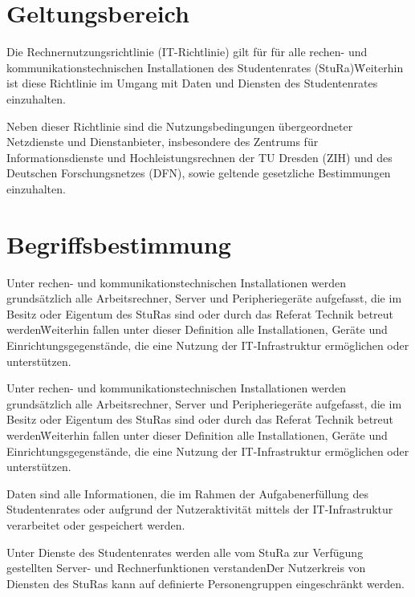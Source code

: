 \setcounter{section}{0}
\begin{multicols}{2}


\section{Geltungsbereich}

\Abs \Satz Die Rechnernutzungsrichtlinie (IT-Richtlinie) gilt für für alle rechen- und kommunikationstechnischen Installationen des Studentenrates (StuRa)\. Weiterhin ist diese Richtlinie im Umgang mit Daten und Diensten des Studentenrates einzuhalten. 

\Abs \Satz Neben dieser Richtlinie sind die Nutzungsbedingungen übergeordneter Netzdienste und Dienstanbieter, insbesondere des Zentrums für Informationsdienste und Hochleistungsrechnen der TU Dresden (ZIH) und des Deutschen Forschungsnetzes (DFN), sowie geltende gesetzliche Bestimmungen einzuhalten.


\section{Begriffsbestimmung}

\Abs \Satz Unter rechen- und kommunikationstechnischen Installationen werden grundsätzlich alle Arbeitsrechner, Server und Peripheriegeräte aufgefasst, die im Besitz oder Eigentum des StuRas sind oder durch das Referat Technik betreut werden\. Weiterhin fallen unter dieser Definition alle Installationen, Geräte und Einrichtungsgegenstände, die eine Nutzung der IT-Infrastruktur ermöglichen oder unterstützen. 

\Abs \Satz Unter rechen- und kommunikationstechnischen Installationen werden grundsätzlich alle Arbeitsrechner, Server und Peripheriegeräte aufgefasst, die im Besitz oder Eigentum des StuRas sind oder durch das Referat Technik betreut werden\. Weiterhin fallen unter dieser Definition alle Installationen, Geräte und Einrichtungsgegenstände, die eine Nutzung der IT-Infrastruktur ermöglichen oder unterstützen. 

\Abs \Satz Daten sind alle Informationen, die im Rahmen der Aufgabenerfüllung des Studentenrates oder aufgrund der Nutzeraktivität mittels der IT-Infrastruktur verarbeitet oder gespeichert werden. 

\Abs \Satz Unter Dienste des Studentenrates werden alle vom StuRa zur Verfügung gestellten Server- und Rechnerfunktionen verstanden\. Der Nutzerkreis von Diensten des StuRas kann auf definierte Personengruppen eingeschränkt werden. 


\end{multicols}
